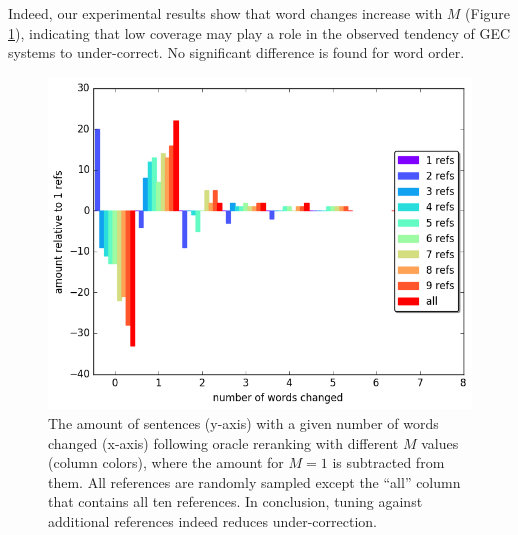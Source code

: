 \documentclass[11pt, a4paper]{article}
\begin{document}

Indeed, our experimental results show that word changes increase with $M$ (Figure \ref{fig:reranking_word_change}),
indicating that low coverage may play a role in the observed tendency of GEC systems to under-correct.
No significant difference is found for word order.

%
\begin{figure}
	\includegraphics[width=\columnwidth]{words_relative_differences_hist_reranking}
	\caption{The amount of sentences (y-axis) with a given number of words changed (x-axis) following oracle reranking with different $M$ values (column colors), 
	where the amount for $M=1$ is subtracted from them.
		All references are randomly sampled except the ``all'' column that contains all ten references.
		In conclusion, tuning against additional references indeed reduces under-correction.
		\label{fig:reranking_word_change}
	}
\end{figure}

%
%
\end{document}
